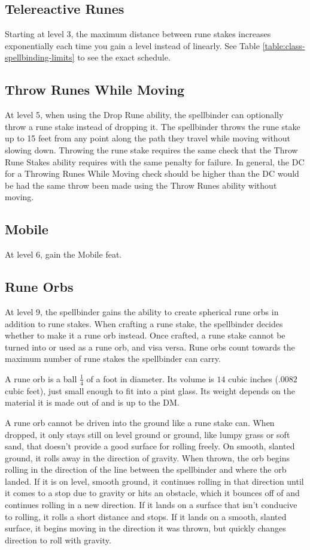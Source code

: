 \subsection{Telereactive Runes}
Starting at level 3, the maximum distance between rune stakes increases exponentially each time you gain a level instead of linearly. See Table \ref{table:class-spellbinding-limits} to see the exact schedule.

\subsection{Throw Runes While Moving}
At level 5, when using the Drop Rune ability, the spellbinder can optionally throw a rune stake instead of dropping it. The spellbinder throws the rune stake up to 15 feet from any point along the path they travel while moving without slowing down. Throwing the rune stake requires the same check that the Throw Rune Stakes ability requires with the same penalty for failure. In general, the DC for a Throwing Runes While Moving check should be higher than the DC would be had the same throw been made using the Throw Runes ability without moving.

\subsection{Mobile}
At level 6, gain the Mobile feat.

\subsection{Rune Orbs}
At level 9, the spellbinder gains the ability to create spherical rune orbs in addition to rune stakes. When crafting a rune stake, the spellbinder decides whether to make it a rune orb instead. Once crafted, a rune stake cannot be turned into or used as a rune orb, and visa versa. Rune orbs count towards the maximum number of rune stakes the spellbinder can carry.

A rune orb is a ball $\frac{1}{4}$ of a foot in diameter. Its volume is $14$ cubic inches ($.0082$ cubic feet), just small enough to fit into a pint glass. Its weight depends on the material it is made out of and is up to the DM.

A rune orb cannot be driven into the ground like a rune stake can. When dropped, it only stays still on level ground or ground, like lumpy grass or soft sand, that doesn't provide a good surface for rolling freely. On smooth, slanted ground, it rolls away in the direction of gravity. When thrown, the orb begins rolling in the direction of the line between the spellbinder and where the orb landed. If it is on level, smooth ground, it continues rolling in that direction until it comes to a stop due to gravity or hits an obstacle, which it bounces off of and continues rolling in a new direction. If it lands on a surface that isn't conducive to rolling, it rolls a short distance and stops. If it lands on a smooth, slanted surface, it begins moving in the direction it was thrown, but quickly changes direction to roll with gravity.

